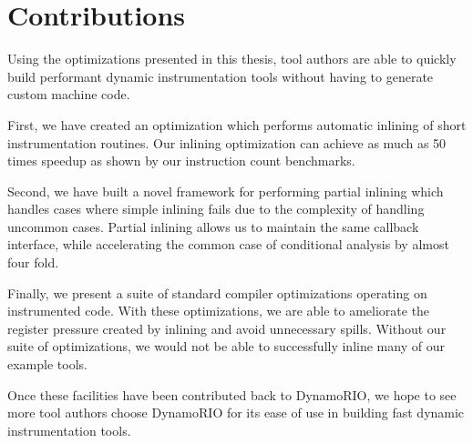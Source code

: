 \section{Contributions}
\label{sec:contributions}

Using the optimizations presented in this thesis, tool authors are able to
quickly build performant dynamic instrumentation tools without having to
generate custom machine code.

First, we have created an optimization which performs automatic inlining of
short instrumentation routines.  Our inlining optimization can achieve as much
as 50 times speedup as shown by our instruction count benchmarks.

Second, we have built a novel framework for performing partial inlining which
handles cases where simple inlining fails due to the complexity of handling
uncommon cases.  Partial inlining allows us to maintain the same callback
interface, while accelerating the common case of conditional analysis by almost
four fold.

Finally, we present a suite of standard compiler optimizations operating on
instrumented code.  With these optimizations, we are able to ameliorate the
register pressure created by inlining and avoid unnecessary spills.  Without our
suite of optimizations, we would not be able to successfully inline many of our
example tools.

Once these facilities have been contributed back to DynamoRIO, we hope to see
more tool authors choose DynamoRIO for its ease of use in building fast dynamic
instrumentation tools.
